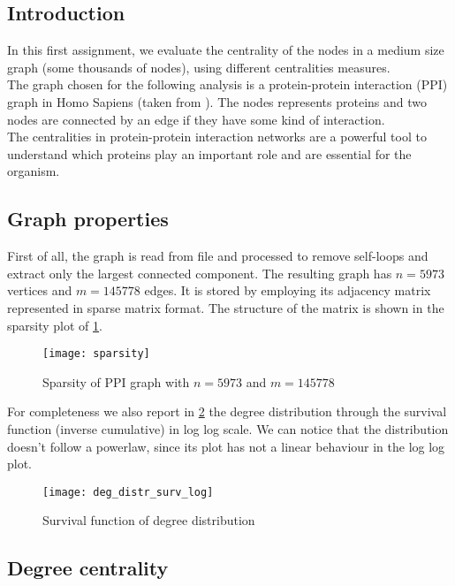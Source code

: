 \graphicspath{{../assignment1/figures/}}

\subsection{Introduction}

In this first assignment, we evaluate the centrality of the nodes in a medium size graph (some thousands of nodes), using different centralities measures.\\
The graph chosen for the following analysis is a protein-protein interaction (PPI) graph in Homo Sapiens (taken from \cite{db_react}). The nodes represents proteins and two nodes are connected by an edge if they have some kind of interaction.\\
The centralities in protein-protein interaction networks are a powerful tool to understand which proteins play an important role and are essential for the organism.

\subsection{Graph properties}
First of all, the graph is read from file and processed to remove self-loops and extract only the largest connected component.
The resulting graph has  $n = 5973$ vertices and $m = 145778$ edges. It is stored by employing its adjacency matrix represented in sparse matrix format.
The structure of the matrix is shown in the sparsity plot of \cref{fig:1_sparsity}.

\begin{figure} [!ht]
	\centering
	\texttt{[image: sparsity]}
	\caption{Sparsity of PPI graph with  $n = 5973$ and $m = 145778$}
	\label{fig:1_sparsity}
\end{figure}
For completeness we also report in  \cref{fig:1_surv_log} the degree distribution through the survival function (inverse cumulative) in log log scale. We can notice that the distribution doesn't follow a powerlaw, since its plot has not a linear behaviour in the log log plot.

\begin{figure} [!ht]
	\centering
	\texttt{[image: deg\_distr\_surv\_log]}
	\caption{Survival function of degree distribution}
	\label{fig:1_surv_log}
\end{figure}
\pagebreak

\subsection{Degree centrality}

